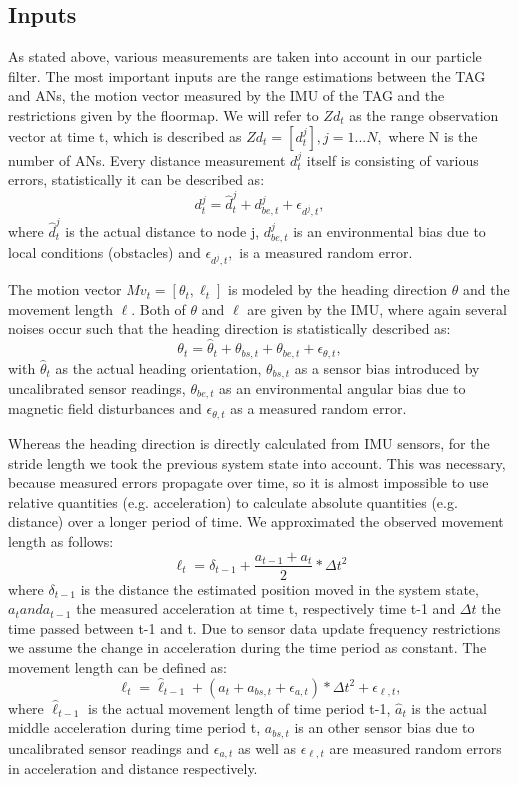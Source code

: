 \subsection{Inputs}
As stated above, various measurements are taken into account in our particle filter. The most important inputs are the range estimations between the TAG and ANs, the motion vector measured by the IMU of the TAG and the restrictions given by the floormap. We will refer to $Zd_{t}$ as the range observation vector at time t, which is described as $Zd_{t} = [d^{j}_{t}], j = 1...N,$ where N is the number of ANs. Every distance measurement $d^{j}_{t}$ itself is consisting of various errors, statistically it can be described as: 
$$d^{j}_{t} = \hat{d}^{j}_{t} + d^{j}_{be, t} + \epsilon_{d^{j}, t},$$
where $\hat{d}^{j}_{t}$ is the actual distance to node j, $d^{j}_{be, t}$ is an environmental bias due to local conditions (obstacles) and $\epsilon_{d^{j}, t},$ is a measured random error.

The motion vector $Mv_{t} = [\theta_{t}, \ell_{t}]$ is modeled by the heading direction $\theta$ and the movement length $\ell$. Both of $\theta$ and $\ell$ are given by the IMU, where again several noises occur such that the heading direction is statistically described as:
$$\theta_{t} = \hat{\theta}_{t} + \theta_{bs,t} + \theta_{be,t} + \epsilon_{\theta, t},$$
with $\hat{\theta}_{t}$ as the actual heading orientation,  $\theta_{bs,t}$ as a sensor bias introduced by uncalibrated sensor readings, $\theta_{be,t}$ as an environmental angular bias due to magnetic field disturbances and $\epsilon_{\theta, t}$ as a measured random error. 

Whereas the heading direction is directly calculated from IMU sensors, for the stride length we took the previous system state into account. This was necessary, because measured errors propagate over time, so it is almost impossible to use relative quantities (e.g. acceleration) to calculate absolute quantities (e.g. distance) over a longer period of time.
We approximated the observed movement length as follows:
$$\ell_{t} = \delta_{t-1} + \frac{a_{t-1} + a_{t}}{2} * \Delta t^{2}$$
where $\delta_{t-1}$ is the distance the estimated position moved in the system state, $a_{t} and a_{t-1}$ the measured acceleration at time t, respectively time t-1 and $\Delta t$ the time passed between t-1 and t. Due to sensor data update frequency restrictions we assume the change in acceleration during the time period as constant. The movement length can be defined as: 
$$\ell_{t} = \hat{\ell}_{t-1} + (\hat{a}_{t} + a_{bs,t} +\epsilon_{a, t}) * \Delta t^{2} + \epsilon_{\ell, t},$$
where $\hat{\ell}_{t-1}$ is the actual movement length of time period t-1, $\hat{a}_{t}$ is the actual middle acceleration during time period t, $a_{bs,t}$ is an other sensor bias due to uncalibrated sensor readings and $\epsilon_{a, t}$ as well as $\epsilon_{\ell, t}$ are measured random errors in acceleration and distance respectively. 


